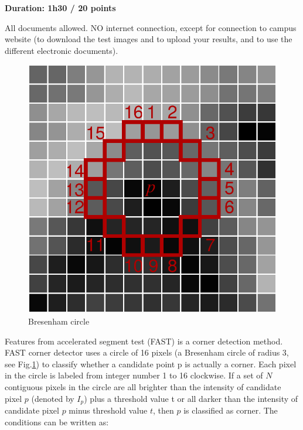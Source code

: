 
\noindent
{\bf Duration: 1h30 / 20 points}

All documents allowed. NO internet connection, except for connection to campus website (to download the test images and to upload your results, and to use the different electronic documents).

\begin{wikipedia}

\begin{figure}\centering
 \includegraphics[width=\linewidth]{fast-corner2.pdf}
 \caption{Bresenham circle}
 \label{fig:exam:2018:ipr:bcircle}

\end{figure}
Features from accelerated segment test (FAST) is a corner detection method. FAST corner detector uses a circle of 16 pixels (a Bresenham circle of radius 3, see Fig.\ref{fig:exam:2018:ipr:bcircle}) to classify whether a candidate point p is actually a corner. Each pixel in the circle is labeled from integer number 1 to 16 clockwise. If a set of $N$ contiguous pixels in the circle are all brighter than the intensity of candidate pixel $p$ (denoted by $I_p$) plus a threshold value t or all darker than the intensity of candidate pixel $p$ minus threshold value $t$, then $p$ is classified as corner. The conditions can be written as:


\end{wikipedia}
